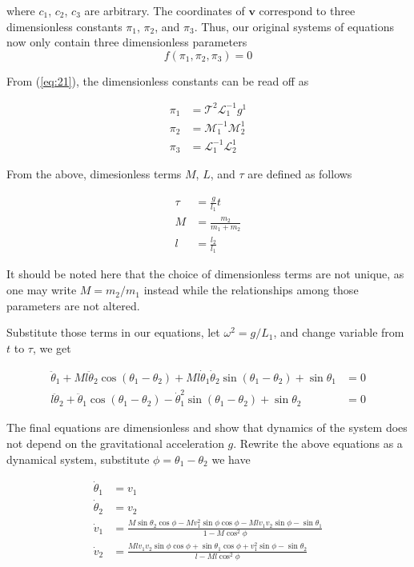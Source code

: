 \documentclass{article}
\begin{document}
where $c_1$, $c_2$, $c_3$ are arbitrary. The coordinates of $\bm{v}$ correspond to three dimensionless constants $\pi_1$, $\pi_2$, and $\pi_3$. Thus, our original systems of equations now only contain three dimensionless parameters
\begin{equation}
f(\pi_1, \pi_2, \pi_3) = 0
\end{equation}


From (\ref{eq:21}), the dimensionless constants can be read off as 

\begin{align}
\pi_1 &= \mathcal{T}^2\mathcal{L}_1^{-1}g^1 \\
\pi_2 &= \mathcal{M}_1^{-1}\mathcal{M}_2^1 \\
\pi_3 &= \mathcal{L}_1^{-1}\mathcal{L}_2^1
\end{align}




From the above, dimesionless terms $M$, $L$, and $\tau$ are defined as follows

\begin{align}
\tau &= \frac{g}{l_1}t \\
M &= \frac{m_2}{m_1 + m_2} \\
l &= \frac{l_2}{l_1} 
\end{align}

It should be noted here that the choice of dimensionless terms are not unique, as one may write $M = m_2/m_1$ instead while the relationships among those parameters are not altered. 

Substitute those terms in our equations, let $\omega^2 = g/L_1$, and change variable from $t$ to $\tau$, we get

\begin{align}
\ddot \theta_1 + Ml\ddot \theta_2\cos(\theta_1 - \theta_2) + Ml\dot \theta_1\dot \theta_2\sin(\theta_1 - \theta_2) + \sin\theta_1 &= 0 \\
l\ddot \theta_2 + \ddot \theta_1\cos(\theta_1 - \theta_2) - \dot \theta_1^2\sin(\theta_1 - \theta_2) + \sin\theta_2 &= 0
\end{align}

The final equations are dimensionless and show that dynamics of the system does not depend on the gravitational acceleration $g$. Rewrite the above equations as a dynamical system, substitute $\phi = \theta_1 - \theta_2$ we have

\begin{align}
\dot \theta_1 &= v_1 \\
\dot \theta_2 &= v_2 \\
\dot v_1 &= \frac{M\sin\theta_2 \cos\phi - Mv_1^2\sin\phi \cos\phi - Mlv_1v_2\sin\phi - \sin\theta_1}{1 - M\cos^2\phi} \\
\dot v_2 &= \frac{Mlv_1v_2\sin\phi \cos\phi + \sin\theta_1\cos\phi + v_1^2\sin\phi - \sin\theta_2}{l - Ml\cos^2\phi}
\end{align}
\end{document}
